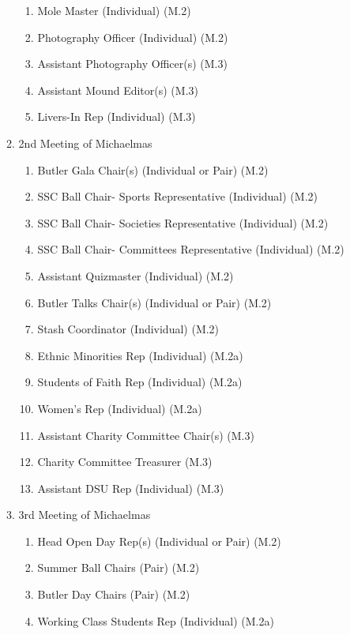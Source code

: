 \begin{enumerate}
\begin{enumerate}
\begin{enumerate}
            \item Mole Master (Individual) (M.2)
            \item Photography Officer (Individual) (M.2)
            \item Assistant Photography Officer(s) (M.3)
            \item Assistant Mound Editor(s) (M.3)
            \item Livers-In Rep (Individual) (M.3)
        \end{enumerate}
        \item 2nd Meeting of Michaelmas
        \begin{enumerate}
            \item Butler Gala Chair(s) (Individual or Pair) (M.2)
            \item SSC Ball Chair- Sports Representative (Individual) (M.2)
            \item SSC Ball Chair- Societies Representative (Individual) (M.2)
            \item SSC Ball Chair- Committees Representative (Individual) (M.2)
            \item Assistant Quizmaster (Individual) (M.2)
            \item Butler Talks Chair(s) (Individual or Pair) (M.2)
            \item Stash Coordinator (Individual) (M.2)
            \item Ethnic Minorities Rep (Individual) (M.2a)
            \item Students of Faith Rep (Individual) (M.2a)
            \item Women's Rep (Individual) (M.2a)
            \item Assistant Charity Committee Chair(s) (M.3)
            \item Charity Committee Treasurer (M.3)
            \item Assistant DSU Rep (Individual) (M.3)
        \end{enumerate}
        \item 3rd Meeting of Michaelmas
        \begin{enumerate}
            \item Head Open Day Rep(s) (Individual or Pair) (M.2)
            \item Summer Ball Chairs (Pair) (M.2)
            \item Butler Day Chairs (Pair) (M.2)
            \item Working Class Students Rep (Individual) (M.2a)

\end{enumerate}
\end{enumerate}
\end{enumerate}
